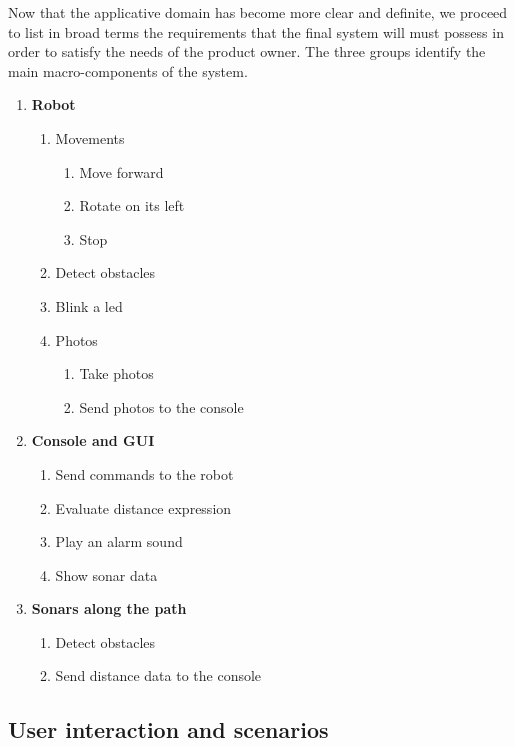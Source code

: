 \documentclass[a4paper]{article}
\begin{document}
Now that the applicative domain has become more clear and definite, we proceed to list in broad terms the requirements that the final system will must possess in order to satisfy the needs of the product owner. The three groups identify the main macro-components of the system.

\begin{enumerate}

	\item \textbf{Robot}
		\begin{enumerate}
			\item Movements
				\begin{enumerate}
					\item Move forward
					\item Rotate on its left
					\item Stop
				\end{enumerate}
			\item Detect obstacles
			\item Blink a led
			\item Photos
				\begin{enumerate}
					\item Take photos
					\item Send photos to the console
				\end{enumerate}
		\end{enumerate}
	\item \textbf{Console and GUI}
		\begin{enumerate}
			\item Send commands to the robot
			\item Evaluate distance expression
			\item Play an alarm sound
			\item Show sonar data
		\end{enumerate}
	\item \textbf{Sonars along the path}
		\begin{enumerate}
			\item Detect obstacles
			\item Send distance data to the console
		\end{enumerate}
	
\end{enumerate}


\subsection {User interaction and scenarios}
\end{document}
